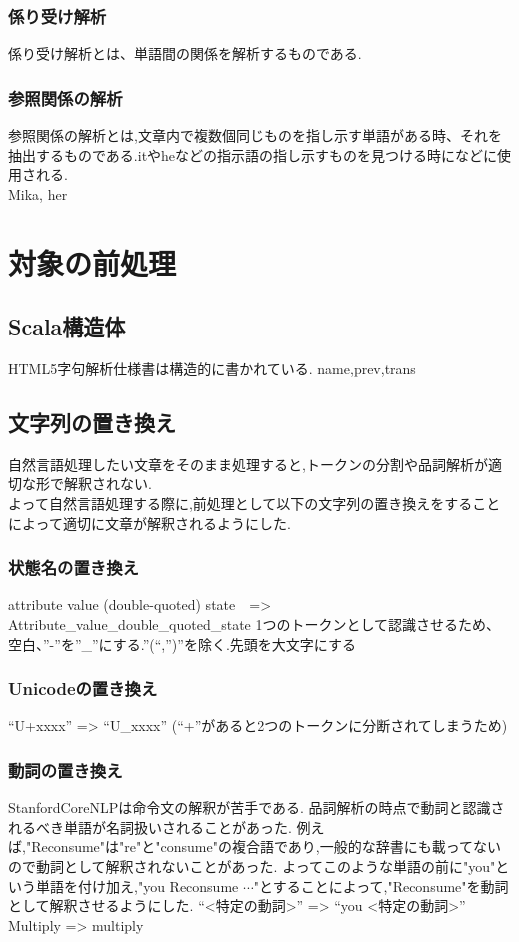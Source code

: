 \documentclass[uplatex,a4j]{jsreport}
\begin{document}
\subsubsection{係り受け解析}
係り受け解析とは、単語間の関係を解析するものである.\\
\subsubsection{参照関係の解析}
参照関係の解析とは,文章内で複数個同じものを指し示す単語がある時、それを抽出するものである.itやheなどの指示語の指し示すものを見つける時になどに使用される.\\
Mika, her

\section{対象の前処理}
\subsection{Scala構造体}
HTML5字句解析仕様書は構造的に書かれている.
name,prev,trans
\subsection{文字列の置き換え}
自然言語処理したい文章をそのまま処理すると,トークンの分割や品詞解析が適切な形で解釈されない.\\
よって自然言語処理する際に,前処理として以下の文字列の置き換えをすることによって適切に文章が解釈されるようにした.
\subsubsection*{状態名の置き換え}
attribute value (double-quoted) state　=>  
Attribute_value_double_quoted_state 
1つのトークンとして認識させるため、
空白、”-”を”_”にする.”(“,”)”を除く.先頭を大文字にする

\subsubsection*{Unicodeの置き換え}
“U+xxxx” => “U_xxxx”
 (“+”があると2つのトークンに分断されてしまうため)
\subsubsection*{動詞の置き換え}
StanfordCoreNLPは命令文の解釈が苦手である.
品詞解析の時点で動詞と認識されるべき単語が名詞扱いされることがあった.
例えば,"Reconsume"は"re"と"consume"の複合語であり,一般的な辞書にも載ってないので動詞として解釈されないことがあった.
よってこのような単語の前に"you"という単語を付け加え,"you Reconsume $\cdots$"とすることによって,"Reconsume"を動詞として解釈させるようにした.
“<特定の動詞>” => “you <特定の動詞>”
Multiply => multiply
\end{document}
